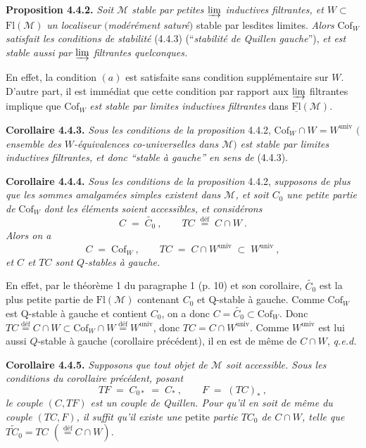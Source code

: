 \documentclass[11pt]{article}
\newcommand{\msp}[1]{\marginpar{\footnotesize [#1]}}
\newcommand{\Fl}{\mathrm{Fl}}
\newcommand{\Cof}{\mathrm{Cof}}
\newcommand{\deq}{\overset{\text{déf}}{=}}
\newcommand{\univ}{\mathrm{univ}}
\begin{document}
\textbf{Proposition 4.4.2.} \textit{Soit $\mathcal{M}$ stable par petites $\varinjlim$ inductives filtrantes, et $W\subset$} $\Fl(\mathcal{M})$ \textit{un localiseur $($modérément saturé$)$} stable par lesdites limites. \textit{Alors} $\Cof_W$ \textit{satisfait les conditions de stabilité} (4.4.3) (“\textit{stabilité de Quillen gauche}”), \textit{et est stable aussi par $\varinjlim$ filtrantes quelconques.}

En effet, la condition $(a)$ est satisfaite sans condition supplémentaire sur $W$. D'autre part, il est immédiat que cette condition par rapport aux $\varinjlim$ filtrantes implique que $\Cof_W$ \textit{est stable par limites inductives filtrantes} dans $\underline{\Fl}(\mathcal{M})$.

\textbf{Corollaire 4.4.3.} \textit{Sous les conditions de la proposition} 4.4.2, $\Cof_W\cap W=W^{\univ}$ $($\textit{ensemble des $W$-équivalences co-universelles dans $\mathcal{M}$}$)$ \textit{est stable par limites inductives filtrantes, et donc “stable à gauche” en sens de} (4.4.3).

\textbf{Corollaire 4.4.4.} \textit{Sous les conditions de la proposition} 4.4.2, \textit{supposons de plus que les sommes amalgamées simples existent dans $\mathcal{M}$, et soit $C_0$ une petite partie de} $\Cof_W$ \textit{dont les éléments soient accessibles, et considérons}
\[
C\;=\;\widetilde{C_0}\ ,\qquad TC\;\deq\;C\cap W\ .
\]
\textit{Alors on a}
\[
C\;=\;\Cof_W\ ,\qquad TC\;=\;C\cap W^{\univ}\;\subset\;W^{\univ}\ ,
\]
\msp{page 41}
\textit{et $C$ et $TC$ sont $Q$-stables à gauche.}

En effet, par le théorème 1 du paragraphe 1 (p. 10) et son corollaire, $\widetilde{C_0}$ est la plus petite partie de $\Fl(\mathcal{M})$ contenant $C_0$ et Q-stable à gauche. Comme $\Cof_W$ est Q-stable à gauche et contient $C_0$, on a donc $C=\widetilde{C_0}\subset\Cof_W$. Donc $TC\deq C{\cap}W\subset\Cof_W{\cap}W\deq W^{\univ}$, donc $TC=C\cap W^{\univ}$. Comme $W^{\univ}$ est lui aussi $Q$-stable à gauche (corollaire précédent), il en est de même de $C\cap W$, \quad \textit{q.e.d.}

\textbf{Corollaire 4.4.5.} \textit{Supposons que tout objet de $\mathcal{M}$ soit accessible. Sous les conditions du corollaire précédent, posant}
\[
TF\;=\;C_{0*}\;=\;C_*\ ,\qquad F\;=\;(TC)_*\ ,
\]
\textit{le couple $(C,TF)$ est un couple de Quillen. Pour qu'il en soit de même du couple $(TC,F)$, il suffit qu'il existe une} petite \textit{partie $TC_0$ de $C\cap W$, telle que $\widetilde{TC_0}=TC$ $(\deq C\cap W)$.}
\end{document}
